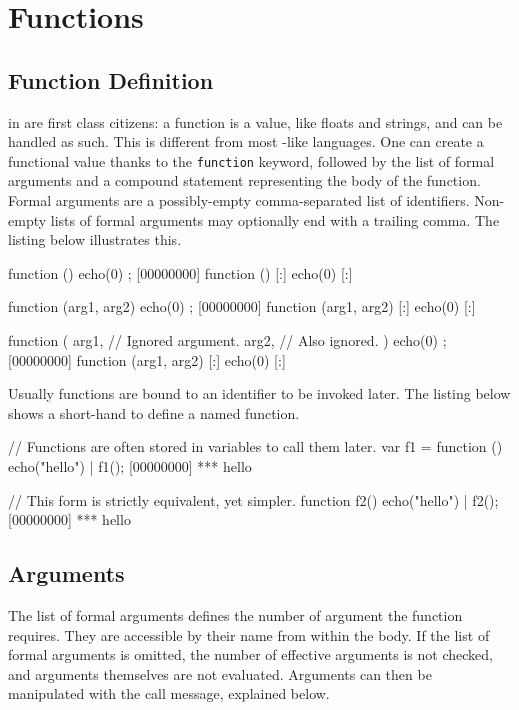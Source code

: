 \section{Functions}

\subsection{Function Definition}

 in \us are first class citizens: a function is a
value, like floats and strings, and can be handled as such.  This is
different from most \C-like languages.  One can create a functional
value thanks to the \lstinline|function| keyword, followed by the list
of formal arguments and a compound statement representing the body of
the function. Formal arguments are a possibly-empty comma-separated
list of identifiers.  Non-empty lists of formal arguments may
optionally end with a trailing comma. The listing below illustrates
this.

\begin{urbiscript}[firstnumber=last]
function () { echo(0) };
[00000000] function () {
[:]  echo(0)
[:]}

function (arg1, arg2) { echo(0) };
[00000000] function (arg1, arg2) {
[:]  echo(0)
[:]}

function (
           arg1, // Ignored argument.
           arg2, // Also ignored.
          )
{
  echo(0)
};
[00000000] function (arg1, arg2) {
[:]  echo(0)
[:]}
\end{urbiscript}

Usually functions are bound to an identifier to be invoked later.
The listing below shows a short-hand to define a named
function.

\begin{urbiscript}[firstnumber=last]
// Functions are often stored in variables to call them later.
var f1 = function () {
  echo("hello")
}|
f1();
[00000000] *** hello

// This form is strictly equivalent, yet simpler.
function f2()
{
  echo("hello")
}|
f2();
[00000000] *** hello
\end{urbiscript}


\subsection{Arguments}

The list of formal arguments defines the number of argument the
function requires. They are accessible by their name from within the
body. If the list of formal arguments is omitted, the number of
effective arguments is not checked, and arguments themselves are not
evaluated. Arguments can then be manipulated with the call message,
explained below.

